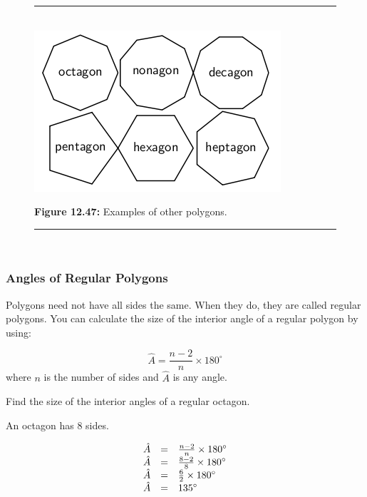 \par
\setcounter{subfigure}{0}
\begin{figure}[H] %
\begin{center}
\rule[.1in]{\figurerulewidth}{.005in} \\
\label{m39368*uid93!!!underscore!!!media}\label{
m39368*uid93!!!underscore!!!printimage}\includegraphics{
col11306.imgs/m39368_MG10C13_046.png} %
\vspace{2pt}
\vspace{\rubberspace}\par \begin{cnxcaption}
\small \textbf{Figure 12.47: }Examples of other polygons.
\end{cnxcaption}
\vspace{.1in}
\rule[.1in]{\figurerulewidth}{.005in} \\
\end{center}
\end{figure}       

\subsubsection{ Angles of Regular Polygons}
\nopagebreak
Polygons need not have all sides the same. When they do, they are called regular
polygons. You can calculate the size of the interior angle of a regular polygon
by using:\par 


\begin{equation*}
\hat{A}=\frac{n-2}{n}\ensuremath{\times}{180}^{\circ }
\end{equation*}
where $n$ is the number of sides and $\hat{A}$ is any angle.
\begin{wex}{}
{

Find the size of the interior angles of a regular octagon.}
{
\westep{}
An octagon has 8 sides.
\westep{}

\begin{equation*}
\begin{array}{ccc}\hfill \hat{A}& =&
\frac{n-2}{n}\ensuremath{\times}{180}^{\circ }\hfill \\
 \hfill \hat{A}& =& \frac{8-2}{8}\ensuremath{\times}{180}^{\circ }\hfill \\
 \hfill \hat{A}& =& \frac{6}{2}\ensuremath{\times}{180}^{\circ }\hfill \\
 \hfill \hat{A}& =& {135}^{\circ }\hfill 
\end{array}
\end{equation*}
}
\end{wex}



